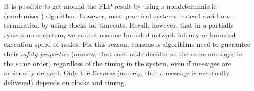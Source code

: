 It is possible to get around the FLP result by using a nondeterministic (randomised) algorithm.
However, most practical systems instead avoid non-termination by using clocks for timeouts.
Recall, however, that in a partially synchronous system, we cannot assume bounded network latency or bounded execution speed of nodes.
For this reason, consensus algorithms need to guarantee their \emph{safety properties} (namely, that each node decides on the same messages in the same order) regardless of the timing in the system, even if messages are arbitrarily delayed.
Only the \emph{liveness} (namely, that a message is eventually delivered) depends on clocks and timing.


